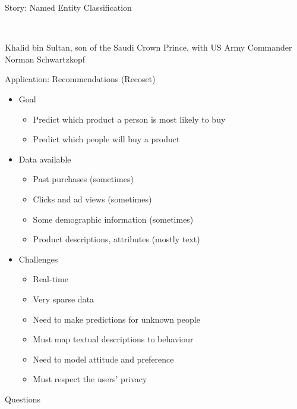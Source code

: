 \documentclass{beamer}
\begin{document}
\begin{frame}{Story: Named Entity Classification}

  \begin{center}
     \\
    \begin{tiny}{Khalid bin Sultan, son of the Saudi Crown Prince, with US Army Commander Norman Schwartzkopf}\end{tiny}
  \end{center}

\end{frame}

\begin{frame}{Application: Recommendations (Recoset)}


\begin{itemize}
\item Goal
  \begin{itemize}
  \item Predict \alert{which product} a person is most likely to  buy
  \item Predict \alert{which people} will buy a product \pause
  \end{itemize}
\item Data available
  \begin{itemize}
    \item Past purchases (sometimes)
    \item Clicks and ad views (sometimes)
    \item Some demographic information (sometimes)
    \item Product descriptions, attributes (mostly text) \pause
  \end{itemize}
\item Challenges
  \begin{itemize}
    \item Real-time
    \item Very sparse data
    \item Need to make predictions for unknown people
    \item Must map \alert{textual descriptions} to behaviour
    \item Need to model \alert{attitude} and \alert{preference}
    \item Must respect the users' \alert{privacy}
  \end{itemize}
\end{itemize}
\end{frame}

\begin{frame}{Questions}
\end{frame}
\end{document}
